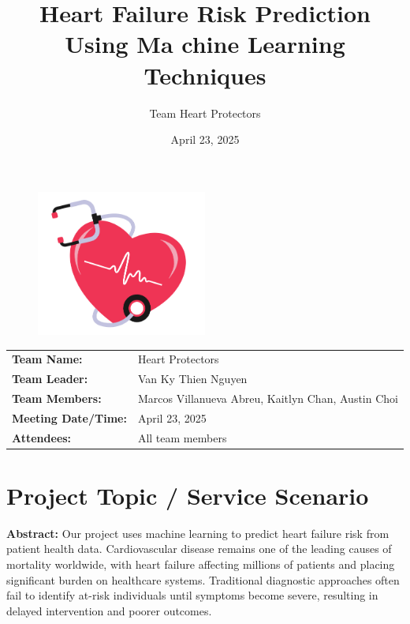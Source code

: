\documentclass[11pt,a4paper]{article}
\makeatletter
\renewcommand{\maketitle}{
  \begin{center}
    \vspace*{-0.25in} %
    {\LARGE \textbf{\@title}} \\[0.3cm]
    {\large \@subtitle} \\[0.2cm]
    {\normalsize \textit{\@author}} \\[0.1cm]
    {\normalsize \@date} \\
  \end{center}
  \vspace{0.3cm} %
}
\newcommand{\subtitle}[1]{\def\@subtitle{#1}}
\def\@subtitle{}
\makeatother
\begin{document}
\begin{figure}[H]
    \centering
    \includegraphics[width=0.5\textwidth]{./pictures/cover.png}
\end{figure}




\title{Heart Failure Risk Prediction Using Ma chine Learning Techniques}
\subtitle{Team Meeting Report – Final Report}
\author{Team Heart Protectors}
\date{April 23, 2025}


\begin{tabular}{ll}
    \textbf{Team Name:}         & Heart Protectors                                   \\
    \textbf{Team Leader:}       & Van Ky Thien Nguyen                                \\
    \textbf{Team Members:}      & Marcos Villanueva Abreu, Kaitlyn Chan, Austin Choi \\
    \textbf{Meeting Date/Time:} & April 23, 2025                                     \\
    \textbf{Attendees:}         & All team members
\end{tabular}

\section{Project Topic / Service Scenario}

\textbf{Abstract:} Our project uses machine learning to predict heart failure risk from patient health data.
Cardiovascular disease remains one of the leading causes of mortality worldwide,
with heart failure affecting millions of patients and placing significant
burden on healthcare systems.
Traditional diagnostic approaches often fail to identify
at-risk individuals until symptoms become severe,
resulting in delayed intervention and poorer outcomes.
\end{document}
